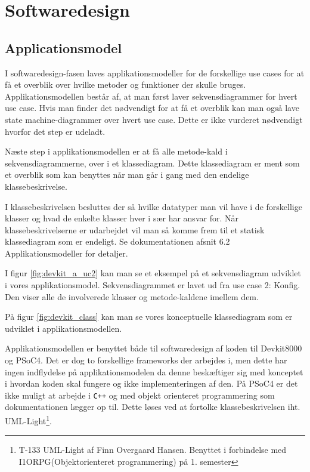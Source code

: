 \section{Softwaredesign}

\subsection{Applicationsmodel}
I softwaredesign-fasen laves applikationsmodeller for de forskellige use cases for at få et overblik over hvilke metoder og funktioner der skulle bruges. Applikationsmodellen består af, at man først laver sekvensdiagrammer for hvert use case. Hvis man finder det nødvendigt for at få et overblik kan man også lave state machine-diagrammer over hvert use case. Dette er ikke vurderet nødvendigt hvorfor det step er udeladt.

Næste step i applikationsmodellen er at få alle metode-kald i sekvensdiagrammerne, over i et klassediagram. Dette klassediagram er ment som et overblik som kan benyttes når man går i gang med den endelige klassebeskrivelse.

I klassebeskrivelsen besluttes der så hvilke datatyper man vil have i de forskellige klasser og hvad de enkelte klasser hver i sær har ansvar for. Når klassebeskrivelserne er udarbejdet vil man så komme frem til et statisk klassediagram som er endeligt. Se dokumentationen afsnit 6.2 Applikationsmodeller for detaljer.


I figur \ref{fig:devkit_a_uc2} kan man se et eksempel på et sekvensdiagram udviklet i vores applikationsmodel. Sekvensdiagrammet er lavet ud fra use case 2: Konfig. Den viser alle de involverede klasser og metode-kaldene imellem dem.

På figur \ref{fig:devkit_class} kan man se vores konceptuelle klassediagram som er udviklet i applikationsmodellen.


Applikationsmodellen er benyttet både til softwaredesign af koden til Devkit8000 og PSoC4. Det er dog to forskellige frameworks der arbejdes i, men dette har ingen indflydelse på applikationsmodelen da denne beskæftiger sig med konceptet i hvordan koden skal fungere og ikke implementeringen af den. På PSoC4 er det ikke muligt at arbejde i \verb-C++- og med objekt orienteret programmering som dokumentationen lægger op til. Dette løses ved at fortolke klassebeskrivelsen iht. UML-Light\footnote{T-133 UML-Light af Finn Overgaard Hansen. Benyttet i forbindelse med I1ORPG(Objektorienteret programmering) på 1. semester}.

